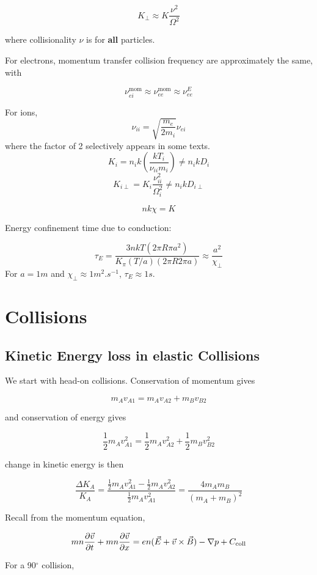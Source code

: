 \documentclass[12pt]{article}
\begin{document}
$$K_\perp \approx K \frac{\nu^2}{\Omega^2}$$

where collisionality $\nu$ is for \textbf{all} particles.

For electrons, momentum transfer collision frequency are approximately the same, with

$$\nu^{\text{mom}}_{ei} \approx \nu^{\text{mom}}_{ee} \approx \nu^E_{ee}$$

For ions,
$$\nu_{ii} = \sqrt{\frac{m_e}{2m_i}}\nu_{ei}$$
where the factor of 2 selectively appears in some texts.
$$K_i = n_ik\left(\frac{kT_i}{\nu_{ii}m_i}\right) \neq n_ikD_i$$
$$K_{i\perp} = K_i \frac{\nu_{ii}^2}{\Omega_i^2} \neq n_ikD_{i\perp}$$

\begin{defn}
    $$nk\chi = K$$
\end{defn}

Energy confinement time due to conduction:

$$\tau_E = \frac{3nkT(2\pi R\pi a^2)}{K_\pi(T/a)(2\pi R2\pi a)} \approx \frac{a^2}{\chi_\perp}$$
For $a = 1\unit{m}$ and $\chi_\perp \approx 1\unit{m^2.s^{-1}}$, $\tau_E \approx 1\unit{s}$.

\section{Collisions}

\subsection{Kinetic Energy loss in elastic Collisions}

We start with head-on collisions. Conservation of momentum gives

$$m_Av_{A1} = m_Av_{A2} + m_Bv_{B2}$$

and conservation of energy gives

$$\frac{1}{2}m_Av_{A1}^2 = \frac{1}{2}m_Av_{A2}^2 + \frac{1}{2}m_Bv_{B2}^2$$

change in kinetic energy is then

$$\frac{\Delta K_A}{K_A} = \frac{\frac{1}{2}m_Av_{A1}^2 - \frac{1}{2}m_Av_{A2}^2}{\frac{1}{2}m_Av_{A1}^2} = \frac{4m_Am_B}{(m_A+m_B)^2}$$

Recall from the momentum equation,

$$mn\frac{\partial \vec v}{\partial t} + mn\frac{\partial \vec v}{\partial x} = en(\vec E + \vec v \times \vec B) - \nabla p + C_{\text{coll}}$$

For a 90$^\circ$ collision,
\end{document}
